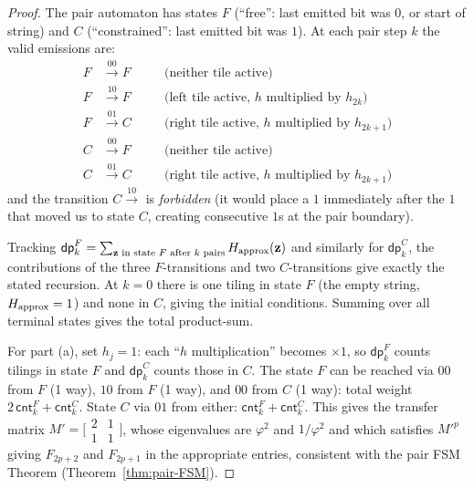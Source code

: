 \documentclass[12pt,reqno]{amsart}
\theoremstyle{definition}
\theoremstyle{plain}
\begin{document}
\begin{proof}
The pair automaton has states $F$ (``free'': last emitted bit was $0$, or
start of string) and $C$ (``constrained'': last emitted bit was $1$).
At each pair step $k$ the valid emissions are:
\begin{align*}
  F &\xrightarrow{00} F &\quad&\text{(neither tile active)}\\
  F &\xrightarrow{10} F &\quad&\text{(left tile active, $h$ multiplied by $h_{2k}$)}\\
  F &\xrightarrow{01} C &\quad&\text{(right tile active, $h$ multiplied by $h_{2k+1}$)}\\
  C &\xrightarrow{00} F &\quad&\text{(neither tile active)}\\
  C &\xrightarrow{01} C &\quad&\text{(right tile active, $h$ multiplied by $h_{2k+1}$)}
\end{align*}
and the transition $C\xrightarrow{10}$ is \emph{forbidden} (it would place a
$1$ immediately after the $1$ that moved us to state $C$, creating consecutive
$1$s at the pair boundary).

Tracking $\mathsf{dp}^F_k = \sum_{\mathbf{z}\text{ in state }F\text{ after }k\text{ pairs}} H_{\rm approx}(\mathbf{z})$
and similarly for $\mathsf{dp}^C_k$, the contributions of the three $F$-transitions
and two $C$-transitions give exactly the stated recursion.  At $k=0$ there is
one tiling in state $F$ (the empty string, $H_{\rm approx}=1$) and none in $C$,
giving the initial conditions.  Summing over all terminal states gives the total
product-sum.

For part (a), set $h_j=1$: each ``$h$ multiplication'' becomes $\times 1$,
so $\mathsf{dp}^F_k$ counts tilings in state $F$ and $\mathsf{dp}^C_k$ counts those
in $C$.  The state $F$ can be reached via $00$ from $F$ (1 way), $10$ from $F$
(1 way), and $00$ from $C$ (1 way): total weight $2\,\mathsf{cnt}^F_k+\mathsf{cnt}^C_k$.
State $C$ via $01$ from either: $\mathsf{cnt}^F_k+\mathsf{cnt}^C_k$.
This gives the transfer matrix $M'=\bigl[\begin{smallmatrix}2&1\\1&1\end{smallmatrix}\bigr]$,
whose eigenvalues are $\varphi^2$ and $1/\varphi^2$ and which satisfies $M'^p$ giving
$F_{2p+2}$ and $F_{2p+1}$ in the appropriate entries, consistent with the pair FSM
Theorem (Theorem~\ref{thm:pair-FSM}).
\end{proof}
\end{document}
